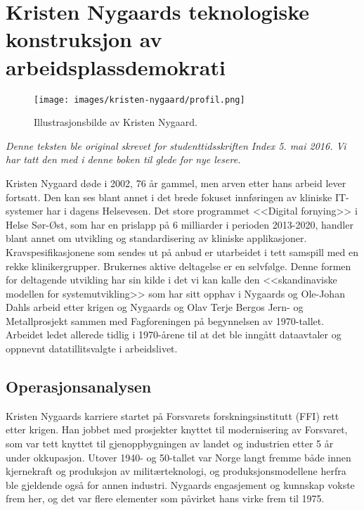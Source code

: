 \chapter[Kristen Nygaard]{Kristen Nygaards teknologiske konstruksjon av arbeidsplassdemokrati}

\author{Skrevet av Egil Øvrelid}

\begin{wrapfigure}{r}{6cm}
	\centering
	\texttt{[image: images/kristen-nygaard/profil.png]}
	\label{fig:kristen-nygaard}
	\caption{Illustrasjonsbilde av Kristen Nygaard.}
\end{wrapfigure}

\emph{Denne teksten ble original skrevet for studenttidsskriften Index 5. mai 2016. Vi har tatt den med i denne boken til glede for nye lesere.}

Kristen Nygaard døde i 2002, 76 år gammel, men arven etter hans arbeid lever fortsatt. Den kan ses blant annet i det brede fokuset innføringen av kliniske IT-systemer har i dagens Helsevesen. Det store programmet <<Digital fornying>> i Helse Sør-Øst, som har en prislapp på 6 milliarder i perioden 2013-2020, handler blant annet om utvikling og standardisering av kliniske applikasjoner. Kravspesifikasjonene som sendes ut på anbud er utarbeidet i tett samspill med en rekke klinikergrupper. Brukernes aktive deltagelse er en selvfølge. Denne formen for deltagende utvikling har sin kilde i det vi kan kalle den <<skandinaviske modellen for systemutvikling>> som har sitt opphav i Nygaards og Ole-Johan Dahls arbeid etter krigen og Nygaards og Olav Terje Bergos Jern- og Metallprosjekt sammen med Fagforeningen på begynnelsen av 1970-tallet. Arbeidet ledet allerede tidlig i 1970-årene til at det ble inngått dataavtaler og oppnevnt datatillitsvalgte i arbeidslivet.

\section{Operasjonsanalysen}

Kristen Nygaards karriere startet på Forsvarets forskningsinstitutt (FFI) rett etter krigen. Han jobbet med prosjekter knyttet til modernisering av Forsvaret, som var tett knyttet til gjenoppbygningen av landet og industrien etter 5 år under okkupasjon. Utover 1940- og 50-tallet var Norge langt fremme både innen kjernekraft og produksjon av militærteknologi, og produksjonsmodellene herfra ble gjeldende også for annen industri. Nygaards engasjement og kunnskap vokste frem her, og det var flere elementer som påvirket hans virke frem til 1975.

